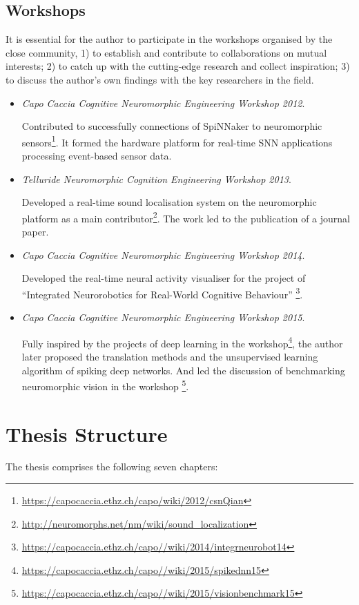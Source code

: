 \subsection{Workshops}
It is essential for the author to participate in the workshops organised by the close community, 1) to establish and contribute to collaborations on mutual interests; 2) to catch up with the cutting-edge research and collect inspiration; 3) to discuss the author's own findings with the key researchers in the field.
\begin{itemize}
	\item 
	\textit{Capo Caccia Cognitive Neuromorphic Engineering Workshop 2012}.
	
	Contributed to successfully connections of SpiNNaker to neuromorphic sensors\footnote{\url{https://capocaccia.ethz.ch/capo/wiki/2012/csnQian}}. 
	It formed the hardware platform for real-time SNN applications processing event-based sensor data.
	
	\item 
	\textit{Telluride Neuromorphic Cognition Engineering Workshop 2013}.
	
	Developed a real-time sound localisation system on the neuromorphic platform as a main contributor\footnote{\url{http://neuromorphs.net/nm/wiki/sound_localization}}.
	The work led to the publication of a journal paper\cite{lagorce2015breaking}.
	
	
	\item 
	\textit{Capo Caccia Cognitive Neuromorphic Engineering Workshop 2014}.
	
	Developed the real-time neural activity visualiser for the project of ``Integrated Neurorobotics for Real-World Cognitive Behaviour'' \footnote{\url{https://capocaccia.ethz.ch/capo//wiki/2014/integrneurobot14}}. 
	
	\item 
	\textit{Capo Caccia Cognitive Neuromorphic Engineering Workshop 2015}.
	
	Fully inspired by the projects of deep learning in the workshop\footnote{\url{https://capocaccia.ethz.ch/capo//wiki/2015/spikednn15}}, the author later proposed the translation methods and the unsupervised learning algorithm of spiking deep networks.
	And led the discussion of benchmarking neuromorphic vision in the workshop \footnote{\url{https://capocaccia.ethz.ch/capo//wiki/2015/visionbenchmark15}}. 	
\end{itemize}
\section{Thesis Structure}
The thesis comprises the following seven chapters:

